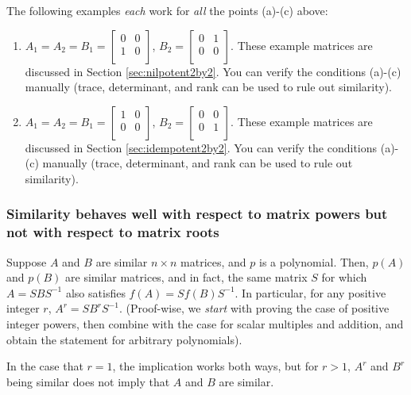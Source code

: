 \documentclass[10pt]{amsart}
\begin{document}
The following examples {\em each} work for {\em all} the points
(a)-(c) above:

\begin{enumerate}
\item $A_1 = A_2 = B_1 = \left[\begin{matrix} 0 & 0 \\ 1 & 0
    \\\end{matrix}\right]$, $B_2 = \left[\begin{matrix} 0 & 1 \\ 0 & 0
    \\\end{matrix}\right]$. These example matrices are discussed in
  Section \ref{sec:nilpotent2by2}. You can verify the conditions
  (a)-(c) manually (trace, determinant, and rank can be used to rule
  out similarity).
\item $A_1 = A_2 = B_1 = \left[\begin{matrix} 1 & 0 \\ 0 & 0
    \\\end{matrix}\right]$, $B_2 = \left[\begin{matrix} 0 & 0 \\ 0 & 1
    \\\end{matrix}\right]$. These example matrices are discussed in
  Section \ref{sec:idempotent2by2}. You can verify the conditions
  (a)-(c) manually (trace, determinant, and rank can be used to rule
  out similarity).
\end{enumerate}

\subsubsection{Similarity behaves well with respect to matrix powers but not with respect to matrix roots}

Suppose $A$ and $B$ are similar $n \times n$ matrices, and $p$ is a
polynomial. Then, $p(A)$ and $p(B)$ are similar matrices, and in fact,
the same matrix $S$ for which $A = SBS^{-1}$ also satisfies $f(A) =
Sf(B)S^{-1}$. In particular, for any positive integer $r$, $A^r =
SB^rS^{-1}$. (Proof-wise, we {\em start} with proving the case of
positive integer powers, then combine with the case for scalar
multiples and addition, and obtain the statement for arbitrary
polynomials).

In the case that $r = 1$, the implication works both ways, but for $r
> 1$, $A^r$ and $B^r$ being similar does not imply that $A$ and $B$
are similar.
\end{document}
